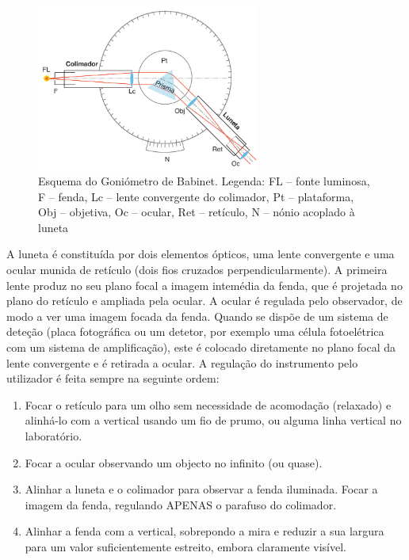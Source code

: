 \documentclass[a4paper,12pt]{article}      %
\begin{document}
\begin{figure}[!htb]  
	\centering 
	\includegraphics[width=0.65\textwidth]{Babinet}
	\caption{Esquema do Goniómetro de Babinet. Legenda: FL -- fonte luminosa, F -- fenda, Lc -- lente convergente do colimador, Pt -- plataforma, Obj -- objetiva, Oc -- ocular, Ret -- retículo, N -- nónio acoplado à luneta\label{fig:babinet}} 
\end{figure}

A luneta é constituída por dois elementos ópticos, uma lente convergente e uma ocular munida de retículo (dois fios cruzados perpendicularmente). A primeira lente produz no seu plano focal a imagem intemédia da fenda, que é projetada no plano do retículo e ampliada pela ocular. A ocular é regulada pelo observador, de modo a ver uma imagem focada da fenda. Quando se dispõe de um sistema de deteção (placa fotográfica ou um detetor, por exemplo uma célula fotoelétrica com um sistema de amplificação), este é colocado diretamente no plano focal da lente convergente e é retirada a ocular.
A regulação do instrumento pelo utilizador é feita sempre na seguinte ordem:
\begin{enumerate}
\item Focar  o retículo para um olho sem necessidade de acomodação (relaxado) e alinhá-lo com a vertical usando um fio de prumo, ou alguma linha vertical no laboratório.
\item Focar a ocular observando um objecto no infinito (ou quase).
\item Alinhar a luneta e o colimador para observar a fenda iluminada. Focar a imagem da fenda, regulando APENAS o parafuso do colimador.
\item Alinhar a fenda com a vertical, sobrepondo a mira e reduzir a sua largura para um valor suficientemente estreito, embora claramente visível.
\end{enumerate}
\end{document}
